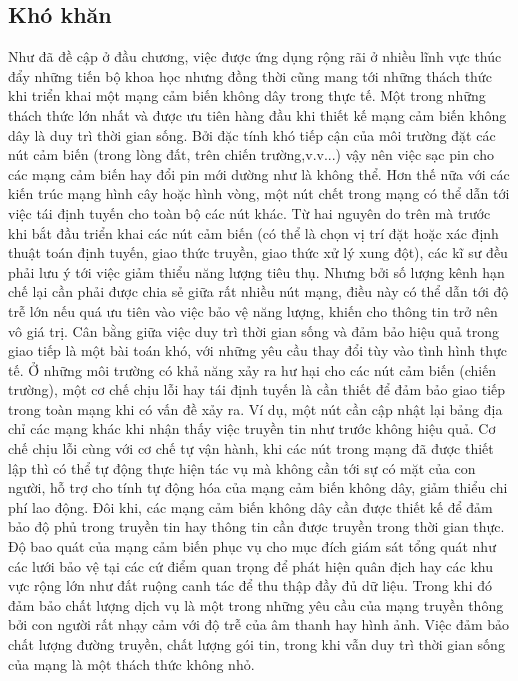 \subsection{Khó khăn}
Như đã đề cập ở đầu chương, việc được ứng dụng rộng rãi ở nhiều lĩnh vực thúc đẩy những tiến bộ khoa học nhưng đồng thời cũng mang tới những thách thức khi triển khai một mạng cảm biến không dây trong thực tế.\cite{wsn_problems}
\linebreak
\linebreak
Một trong những thách thức lớn nhất và được ưu tiên hàng đầu khi thiết kế mạng cảm biến không dây là duy trì thời gian sống. Bởi đặc tính khó tiếp cận của môi trường đặt các nút cảm biến (trong lòng đất, trên chiến trường,v.v...) vậy nên việc sạc pin cho các mạng cảm biến hay đổi pin mới dường như là không thể. Hơn thế nữa với các kiến trúc mạng hình cây hoặc hình vòng, một nút chết trong mạng có thể dẫn tới việc tái định tuyến cho toàn bộ các nút khác. Từ hai nguyên do trên mà trước khi bắt đầu triển khai các nút cảm biến (có thể là chọn vị trí đặt hoặc xác định thuật toán định tuyến, giao thức truyền, giao thức xử lý xung đột), các kĩ sư đều phải lưu ý tới việc giảm thiểu năng lượng tiêu thụ. Nhưng bởi số lượng kênh hạn chế lại cần phải được chia sẻ giữa rất nhiều nút mạng, điều này có thể dẫn tới độ trễ lớn nếu quá ưu tiên vào việc bảo vệ năng lượng, khiến cho thông tin trở nên vô giá trị. Cân bằng giữa việc duy trì thời gian sống và đảm bảo hiệu quả trong giao tiếp là một bài toán khó, với những yêu cầu thay đổi tùy vào tình hình thực tế.
\linebreak
\linebreak
Ở những môi trường có khả năng xảy ra hư hại cho các nút cảm biến (chiến trường), một cơ chế chịu lỗi hay tái định tuyến là cần thiết để đảm bảo giao tiếp trong toàn mạng khi có vấn đề xảy ra. Ví dụ, một nút cần cập nhật lại bảng địa chỉ các mạng khác khi nhận thấy việc truyền tin như trước không hiệu quả. Cơ chế chịu lỗi cùng với cơ chế tự vận hành, khi các nút trong mạng đã được thiết lập thì có thể tự động thực hiện tác vụ mà không cần tới sự có mặt của con người, hỗ trợ cho tính tự động hóa của mạng cảm biến không dây, giảm thiểu chi phí lao động.
\linebreak 
\linebreak
Đôi khi, các mạng cảm biến không dây cần được thiết kế để đảm bảo độ phủ trong truyền tin hay thông tin cần được truyền trong thời gian thực. Độ bao quát của mạng cảm biến phục vụ cho mục đích giám sát tổng quát như các lưới bảo vệ tại các cứ điểm quan trọng để phát hiện quân địch hay các khu vực rộng lớn như đất ruộng canh tác để thu thập đầy đủ dữ liệu. Trong khi đó đảm bảo chất lượng dịch vụ là một trong những yêu cầu của mạng truyền thông bởi con người rất nhạy cảm với độ trễ của âm thanh hay hình ảnh. Việc đảm bảo chất lượng đường truyền, chất lượng gói tin, trong khi vẫn duy trì thời gian sống của mạng là một thách thức không nhỏ.

